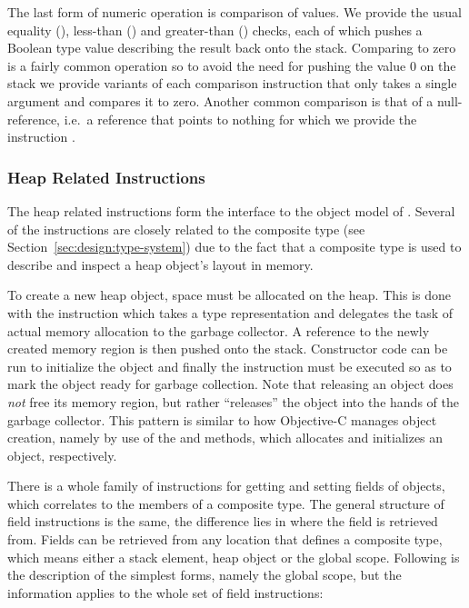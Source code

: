 The last form of numeric operation is comparison of values. We provide the usual
equality (), less-than () and
greater-than () checks, each of which pushes a Boolean
type value describing the result back onto the stack. Comparing to zero is a
fairly common operation so to avoid the need for pushing the value $0$ on the
stack we provide variants of each comparison instruction that only takes a
single argument and compares it to zero. Another common comparison is that of a
null-reference, i.e.~a reference that points to nothing for which we provide the
instruction .

\subsubsection{Heap Related Instructions}

The heap related instructions form the interface to the object model of
\thename{}. Several of the instructions are closely related to the composite
type (see Section~\ref{sec:design:type-system}) due to the fact that a composite
type is used to describe and inspect a heap object's layout in memory.

To create a new heap object, space must be allocated on the heap. This is done
with the  instruction which takes a type representation and delegates
the task of actual memory allocation to the garbage collector. A reference to
the newly created memory region is then pushed onto the stack. Constructor code
can be run to initialize the object and finally the  instruction
must be executed so as to mark the object ready for garbage collection. Note
that releasing an object does \emph{not} free its memory region, but rather
``releases'' the object into the hands of the garbage collector. This pattern is
similar to how Objective-C manages object creation, namely by use of the
 and  methods, which allocates and initializes an object,
respectively.

There is a whole family of instructions for getting and setting fields of
objects, which correlates to the members of a composite type. The general
structure of field instructions is the same, the difference lies in where the
field is retrieved from. Fields can be retrieved from any location that defines
a composite type, which means either a stack element, heap object or the global
scope. Following is the description of the simplest forms, namely the global
scope, but the information applies to the whole set of field instructions:


